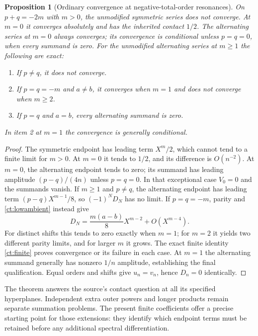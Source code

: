 \documentclass[11pt,letterpaper]{article}
\numberwithin{equation}{section}
\newtheorem{proposition}[theorem]{Proposition}
\theoremstyle{definition}
\theoremstyle{remark}
\begin{document}
\begin{proposition}[Ordinary convergence at negative-total-order resonances]
\label{ct:resonantconvergence}
On $p+q=-2m$ with $m>0$, the unmodified symmetric series does not converge.
At $m=0$ it converges absolutely and has the inherited contact $1/2$.
The alternating series at $m=0$ always converges; its convergence is
conditional unless $p=q=0$, when every summand is zero.
For the unmodified alternating series at $m\ge1$ the following are exact:
\begin{enumerate}
 \item If $p\ne q$, it does not converge.
 \item If $p=q=-m$ and $a\ne b$, it converges when $m=1$ and does
       not converge when $m\ge2$.
 \item If $p=q$ and $a=b$, every alternating summand is zero.
\end{enumerate}
In item 2 at $m=1$ the convergence is generally conditional.
\end{proposition}
\begin{proof}
The symmetric endpoint has leading term $X^m/2$, which cannot tend to a
finite limit for $m>0$. At $m=0$ it tends to $1/2$, and its difference
is $O(n^{-2})$. At $m=0$, the alternating endpoint tends to zero;
its summand has leading amplitude $(p-q)/(4n)$ unless $p=q=0$.
In that exceptional case $V_0=0$ and the summands vanish.
If $m\ge1$ and $p\ne q$, the alternating endpoint has leading term
$(p-q)X^{m-1}/8$, so $(-1)^ND_N$ has no limit. If $p=q=-m$, parity
and \eqref{ct:lowambient} instead give
\[
 D_N=\frac{m(a-b)}8X^{m-2}+O(X^{m-4}).
\]
For distinct shifts this tends to zero exactly when $m=1$; for $m=2$
it yields two different parity limits, and for larger $m$ it grows.
The exact finite identity \eqref{ct:finite} proves convergence or its
failure in each case. At $m=1$ the alternating summand generally has
nonzero $1/n$ amplitude, establishing the final qualification. Equal
orders and shifts give $u_n=v_n$, hence $D_n=0$ identically.
\end{proof}

The theorem answers the source's contact question at all its specified
hyperplanes. Independent extra outer powers and longer products remain
separate summation problems. The present finite coefficients offer a
precise starting point for those extensions: they identify which endpoint
terms must be retained before any additional spectral differentiation.

\end{document}

